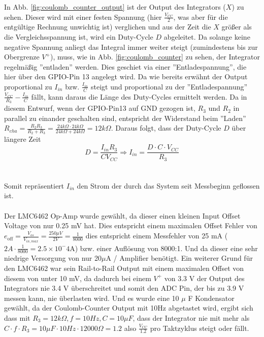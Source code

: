 \documentclass[12pt,a4paper,bibliography=totocnumbered,listof=totocnumbered]{article}
\begin{document}
In Abb. \ref{fig:coulomb_counter_output} ist der Output des Integrators ($X$) zu sehen. Dieser wird mit einer festen Spannung (hier $\frac{V_{CC}}{2}$, was aber für die entgültige Rechnung unwichtig ist) verglichen und aus der Zeit die $X$ größer als die Vergleichsspannung ist, wird ein Duty-Cycle $D$ abgeleitet. Da solange keine negative Spannung anliegt das Integral immer weiter steigt (zumindestens bis zur Obergrenze $V^+$), muss, wie in Abb. \ref{fig:coulomb_counter} zu sehen, der Integrator regelmäßig ''entladen'' werden. Dies geschiet via einer ''Entladespannung'', die hier über den GPIO-Pin 13 angelegt wird. Da wie bereits erwähnt der Output proportional zu $I_{in}$ bzw. $\frac{I_{in}}{C}$ steigt und proportional zu der ''Entladespannung'' $\frac{V_{CC}}{R_{3}} - \frac{I_{in}}{C}$ fällt, kann daraus die Länge des Duty-Cycles ermittelt werden. Da in diesem Entwurf, wenn der GPIO-Pin13 auf GND gezogen ist, $R_3$ und $R_2$ in parallel zu einander geschalten sind, entspricht der Widerstand beim ''Laden'' $R_{cha} = \frac{R_2 R_3}{R_2 + R_3} = \frac{24k\Omega \cdot 24k\Omega}{24k\Omega + 24k\Omega} = 12k\Omega$.  Daraus folgt, dass der Duty-Cycle $D$ über längere Zeit
$$D = \frac{I_{in} R_{3}}{C V_{CC}} \Rightarrow I_{in} = \frac{D \cdot C \cdot V_{CC}}{R_{3}}$$\cite{aoe}\\\\
Somit repräsentiert $I_{in}$ den Strom der durch das System seit Messbeginn geflossen ist.\\\\
Der LMC6462 Op-Amp wurde gewählt, da dieser einen kleinen Input Offset Voltage von nur 0.25 mV hat. Dies entspricht einem maximalen Offset Fehler von $e_{\text{off}} = \frac{V_{os}}{V_{in,max}} = \frac{250 \mu V}{2 V} = \frac{1}{8000}$ dies entspricht einem Messfehler von 25 mA ($2 A \cdot \frac{1}{8000} = 2.5 \times 10^-4$A) bzw. einer Auflösung von 8000:1. Und da dieser eine sehr niedrige Versorgung von nur 20$\mu$A / Amplifier benötigt.
Ein weiterer Grund für den LMC6462 war sein Rail-to-Rail Output mit einem maximalen Offset von diesem von unter 10 mV, da dadurch bei einem $V^+$ von 3.3 V der Output des Integrators nie 3.4 V überschreitet und somit den ADC Pin, der bis zu 3.9 V messen kann, nie überlasten wird. \cite{LMC6462_data_sheet} Und es wurde eine 10 $\mu$ F Kondensator gewählt, da der Coulomb-Counter Output mit 10Hz abgetastet wird, ergibt sich dass mit $R_3 = 12k\Omega, f = 10Hz, C = 10 \mu F$, dass der Integrator nie mit mehr als $C \cdot f \cdot R_3 = 10 \mu F \cdot 10Hz \cdot 12000 \Omega = 1.2$ also $\frac{V_{CC}}{1.2}$ pro Taktzyklus steigt oder fällt. \cite{aoe}
\end{document}
